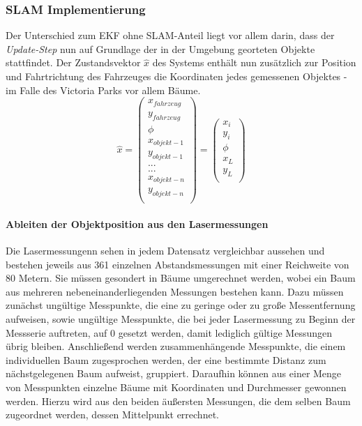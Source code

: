 \documentclass[11pt]{article}
\begin{document}
\subsubsection{SLAM Implementierung}\label{SLAM Implementierung}
Der Unterschied zum EKF ohne SLAM-Anteil liegt vor allem darin, dass der \textit{Update-Step} nun auf Grundlage der in der Umgebung georteten Objekte stattfindet. Der Zustandsvektor $\hat{x}$ des Systems enthält nun zusätzlich zur Position und Fahrtrichtung des Fahrzeuges die Koordinaten jedes gemessenen Objektes - im Falle des Victoria Parks vor allem Bäume. 
\begin{equation}\label{SLAM-State-Vector}
	\hat{x} = \begin{pmatrix}
		x_{fahrzeug} \\
		y_{fahrzeug} \\
		\phi \\
		x_{objekt-1} \\
		y_{objekt-1} \\
		... \\
		... \\
		x_{objekt-n} \\
		y_{objekt-n} \\
	  \end{pmatrix} = \begin{pmatrix}
		  x_i \\
		  y_i \\
		  \phi \\
		  x_L \\
		  y_L \\
	  \end{pmatrix}
\end{equation}

\paragraph{Ableiten der Objektposition aus den Lasermessungen}
Die Lasermessungenn sehen in jedem Datensatz vergleichbar aussehen und bestehen jeweils aus 361 einzelnen Abstandsmessungen mit einer Reichweite von 80 Metern. Sie müssen gesondert in Bäume umgerechnet werden, wobei ein Baum aus mehreren nebeneinanderliegenden Messungen bestehen kann. Dazu müssen zunächst ungültige Messpunkte, die eine zu geringe oder zu große Messentfernung aufweisen, sowie ungültige Messpunkte, die bei jeder Lasermessung zu Beginn der Messserie auftreten, auf 0 gesetzt werden, damit lediglich gültige Messungen übrig bleiben. Anschließend werden zusammenhängende Messpunkte, die einem individuellen Baum zugesprochen werden, der eine bestimmte Distanz zum nächstgelegenen Baum aufweist, gruppiert. Daraufhin können aus einer Menge von Messpunkten einzelne Bäume mit Koordinaten und Durchmesser gewonnen werden. Hierzu wird aus den beiden äußersten Messungen, die dem selben Baum zugeordnet werden, dessen Mittelpunkt errechnet.
\end{document}
